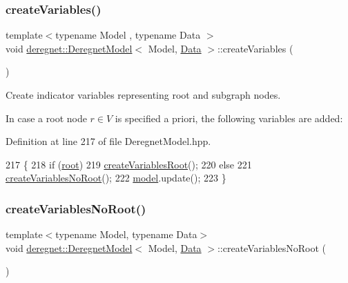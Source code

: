 \subsubsection{\texorpdfstring{create\+Variables()}{createVariables()}}
{\footnotesize\ttfamily template$<$typename Model , typename Data $>$ \\
void \hyperlink{classderegnet_1_1DeregnetModel}{deregnet\+::\+Deregnet\+Model}$<$ Model, \hyperlink{avgdrgnt_8cpp_a1d1235306db276e9b36acba1db1509e8}{Data} $>$\+::create\+Variables (\begin{DoxyParamCaption}{ }\end{DoxyParamCaption})}



Create indicator variables representing root and subgraph nodes. 

In case a root node $r \in V$ is specified a priori, the following variables are added\+: 

Definition at line 217 of file Deregnet\+Model.\+hpp.


\begin{DoxyCode}
217                                                  \{
218     \textcolor{keywordflow}{if} (\hyperlink{classderegnet_1_1DeregnetModel_a54b20393a0e26d65935d387685d7fe96}{root})
219         \hyperlink{classderegnet_1_1DeregnetModel_ad985c03d46183b994dd6f6c037d1c53f}{createVariablesRoot}();
220     \textcolor{keywordflow}{else}
221         \hyperlink{classderegnet_1_1DeregnetModel_ad3700418efd7be24df0d3a16a991a559}{createVariablesNoRoot}();
222     \hyperlink{classderegnet_1_1DeregnetModel_a30d525de2086e342b33fe3e45ede4947}{model}.update();
223 \}
\end{DoxyCode}
\mbox{\label{classderegnet_1_1DeregnetModel_ad3700418efd7be24df0d3a16a991a559}} 
\subsubsection{\texorpdfstring{create\+Variables\+No\+Root()}{createVariablesNoRoot()}\hspace{0.1cm}{\footnotesize\ttfamily [1/3]}}
{\footnotesize\ttfamily template$<$typename Model, typename Data$>$ \\
void \hyperlink{classderegnet_1_1DeregnetModel}{deregnet\+::\+Deregnet\+Model}$<$ Model, \hyperlink{avgdrgnt_8cpp_a1d1235306db276e9b36acba1db1509e8}{Data} $>$\+::create\+Variables\+No\+Root (\begin{DoxyParamCaption}{ }\end{DoxyParamCaption})\hspace{0.3cm}{\ttfamily [private]}}

